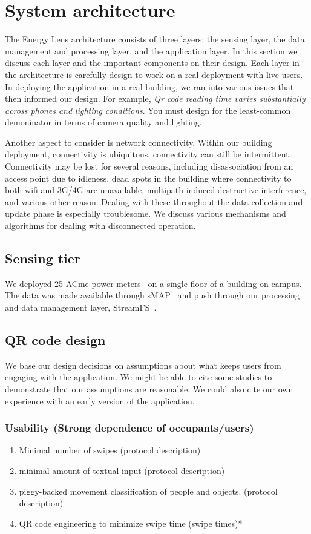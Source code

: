 \section{System architecture}
The Energy Lens architecture consists of three layers: the sensing layer, the data management and processing layer, and the application
layer.  In this section we discuss each layer and the important components on their design.  Each layer in the architecture
is carefully design to work on a real deployment with live users.  In deploying the application in a real building, we ran
into various issues that then informed our design.  For example, \emph{Qr code reading time varies substantially across phones
and lighting conditions}.  You must design for the least-common demoninator in terms of camera quality and lighting.

Another aspect to consider is network connectivity.  Within our building deployment, connectivity is ubiquitous, connectivity
can still be intermittent.  Connectivity may be lost for several reasons, including disassociation from an access point due
to idleness, dead spots in the building where connectivity to both wifi and 3G/4G are unavailable, multipath-induced
destructive interference, and various other reason.  Dealing with these throughout the data collection and update phase is
especially troublesome.  We discuss various mechanisms and algorithms for dealing with disconnected operation.

\subsection{Sensing tier}
We deployed 25 ACme power meters~\cite{acme} on a single floor of a building on campus.  The data was made available through
sMAP~\cite{smap} and push through our processing and data management layer, StreamFS~\cite{streamfs}.

\subsection{QR code design}
\label{sec:qrc}
We base our design decisions on assumptions about what keeps users from engaging with the application.  We might be able to cite some studies to demonstrate that our assumptions are reasonable.  We could also cite our own experience with an early version of the application.

\subsubsection{Usability (Strong dependence of occupants/users)}
\begin{enumerate}
\item Minimal number of swipes (protocol description)
\item minimal amount of textual input (protocol description)
\item piggy-backed movement classification of people and objects. (protocol description)
\item QR code engineering to minimize swipe time (swipe times)*
\end{enumerate}



